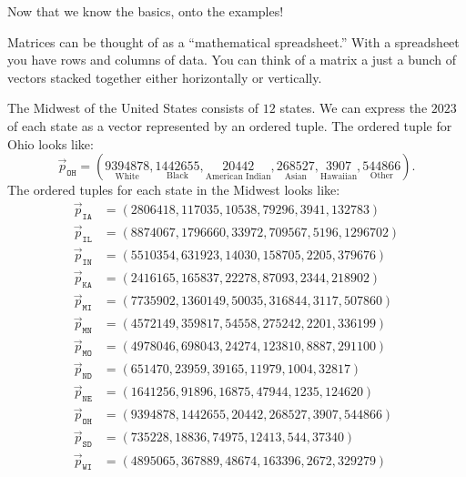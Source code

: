 \documentclass{ximera}
\begin{document}
\begin{exploration}

Now that we know the basics, onto the examples!

Matrices can be thought of as a ``mathematical spreadsheet.'' With a
spreadsheet you have rows and columns of data.  You can think of a
matrix a just a bunch of vectors stacked together either horizontally
or vertically.

 
\begin{example} %
  The Midwest of the United States consists of $12$ states. We can
  express the $2023$
  of each state as a vector represented by an ordered tuple. The
  ordered tuple for Ohio looks like:
  \[
  \vec{p}_{\texttt{OH}} = (\underset{\text{White}}{9394878},\underset{\text{Black}}{1442655},\underset{\text{American Indian}}{20442},\underset{\text{Asian}}{268527},\underset{\text{Hawaiian}}{3907},\underset{\text{Other}}{544866}).
  \]
  The ordered tuples for each state in the Midwest looks like:
\begin{align*}
  \vec{p}_{\texttt{IA}} &= (2806418,117035,10538,79296,3941,132783)\\
  \vec{p}_{\texttt{IL}} &= (8874067,1796660,33972,709567,5196,1296702)\\
  \vec{p}_{\texttt{IN}} &= (5510354,631923,14030,158705,2205,379676)\\
  \vec{p}_{\texttt{KA}} &= (2416165,165837,22278,87093,2344,218902)\\
  \vec{p}_{\texttt{MI}} &= (7735902,1360149,50035,316844,3117,507860)\\
  \vec{p}_{\texttt{MN}} &= (4572149,359817,54558,275242,2201,336199)\\
  \vec{p}_{\texttt{MO}} &= (4978046,698043,24274,123810,8887,291100)\\
  \vec{p}_{\texttt{ND}} &= (651470,23959,39165,11979,1004,32817)\\
  \vec{p}_{\texttt{NE}} &= (1641256,91896,16875,47944,1235,124620)\\
  \vec{p}_{\texttt{OH}} &= (9394878,1442655,20442,268527,3907,544866)\\
  \vec{p}_{\texttt{SD}} &= (735228,18836,74975,12413,544,37340)\\
  \vec{p}_{\texttt{WI}} &= (4895065,367889,48674,163396,2672,329279)
\end{align*}


\end{example}
\end{exploration}
\end{document}
